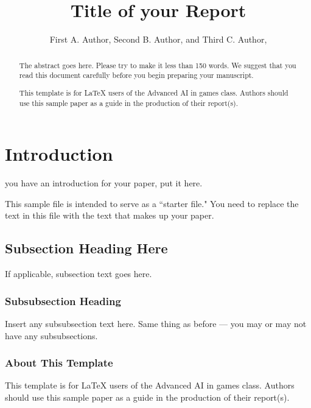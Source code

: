 \documentclass[conference]{IEEEtran}
\begin{document}
\title{\ \\ \LARGE\bf Title of your Report}

\author{First A. Author, Second B. Author, and Third C. Author,}


\maketitle

\begin{abstract}
The abstract goes here.  Please try to make it less than 150 words.
We suggest that you read this document carefully before you begin
preparing your manuscript.

This template is for LaTeX users of the Advanced AI in games class.
Authors should use this sample paper as a guide in the production of
their report(s).
\end{abstract}

\section{Introduction}
 you have an introduction for your paper, put it
here.

This sample file is intended to serve as a ``starter file."  You
need to replace the text in this file with the text that makes up
your paper.

\subsection{Subsection Heading Here}
If applicable, subsection text goes here.

\subsubsection{Subsubsection Heading}
Insert any subsubsection text here.  Same thing as before --- you may
or may not have any subsubsections.

\subsubsection{About This Template}
This template is for LaTeX users of the Advanced AI in games class.
Authors should use this sample paper as a guide in the production of
their report(s).
\end{document}
